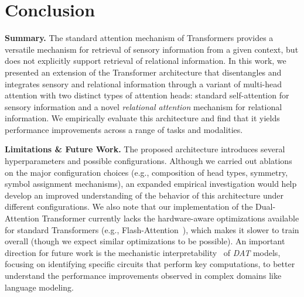 \section{Conclusion}\label{sec:discussion}

\textbf{Summary.} The standard attention mechanism of Transformers provides a versatile mechanism for retrieval of sensory information from a given context, but does not explicitly support retrieval of relational information. In this work, we presented an extension of the Transformer architecture that disentangles and integrates sensory and relational information through a variant of multi-head attention with two distinct types of attention heads: standard self-attention for sensory information and a novel \textit{relational attention} mechanism for relational information. We empirically evaluate this architecture and find that it yields performance improvements across a range of tasks and modalities.

\textbf{Limitations \& Future Work.} The proposed architecture introduces several hyperparameters and possible configurations. Although we carried out ablations on the major configuration choices (e.g., composition of head types, symmetry, symbol assignment mechanisms), an expanded empirical investigation would help develop an improved understanding of the behavior of this architecture under different configurations. 
We also note that our implementation of the Dual-Attention Transformer currently lacks the hardware-aware optimizations available for standard Transformers (e.g., Flash-Attention~\citep{dao2022flashattention}), which makes it slower to train overall (though we expect similar optimizations to be possible). An important direction for future work is the mechanistic interpretability~\citep{elhage2021mathematical,olsson2022context,wang2023interpretability} of \textit{DAT} models, focusing on identifying specific circuits that perform key computations, to better understand the performance improvements observed in complex domains like language modeling.